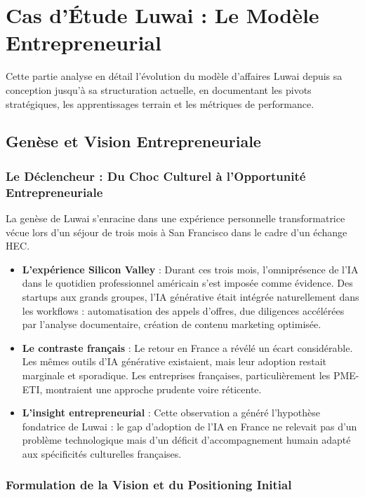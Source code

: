 \chapter{Cas d'Étude Luwai : Le Modèle Entrepreneurial}
\label{chap:luwai_case_study}

Cette partie analyse en détail l'évolution du modèle d'affaires Luwai depuis sa conception jusqu'à sa structuration actuelle, en documentant les pivots stratégiques, les apprentissages terrain et les métriques de performance.

\section{Genèse et Vision Entrepreneuriale}

\subsection{Le Déclencheur : Du Choc Culturel à l'Opportunité Entrepreneuriale}

La genèse de Luwai s'enracine dans une expérience personnelle transformatrice vécue lors d'un séjour de trois mois à San Francisco dans le cadre d'un échange HEC.

\begin{itemize}
    \item \textbf{L'expérience Silicon Valley} : Durant ces trois mois, l'omniprésence de l'IA dans le quotidien professionnel américain s'est imposée comme évidence. Des startups aux grands groupes, l'IA générative était intégrée naturellement dans les workflows : automatisation des appels d'offres, due diligences accélérées par l'analyse documentaire, création de contenu marketing optimisée.
    \item \textbf{Le contraste français} : Le retour en France a révélé un écart considérable. Les mêmes outils d'IA générative existaient, mais leur adoption restait marginale et sporadique. Les entreprises françaises, particulièrement les PME-ETI, montraient une approche prudente voire réticente.
    \item \textbf{L'insight entrepreneurial} : Cette observation a généré l'hypothèse fondatrice de Luwai : le gap d'adoption de l'IA en France ne relevait pas d'un problème technologique mais d'un déficit d'accompagnement humain adapté aux spécificités culturelles françaises.
\end{itemize}

\subsection{Formulation de la Vision et du Positioning Initial}


